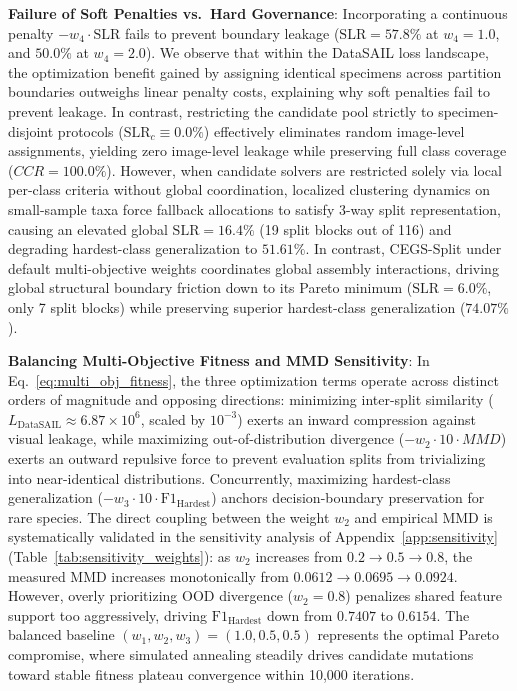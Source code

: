 \documentclass[a4paper,fleqn]{cas-sc}
\begin{document}
\textbf{Failure of Soft Penalties vs.\ Hard Governance}: Incorporating a continuous penalty $-w_4 \cdot \mathrm{SLR}$ fails to prevent boundary leakage ($\mathrm{SLR} = 57.8\%$ at $w_4=1.0$, and $50.0\%$ at $w_4=2.0$). We observe that within the DataSAIL loss landscape, the optimization benefit gained by assigning identical specimens across partition boundaries outweighs linear penalty costs, explaining why soft penalties fail to prevent leakage. In contrast, restricting the candidate pool strictly to specimen-disjoint protocols ($\text{SLR}_c \equiv 0.0\%$) effectively eliminates random image-level assignments, yielding zero image-level leakage while preserving full class coverage ($CCR = 100.0\%$). However, when candidate solvers are restricted solely via local per-class criteria without global coordination, localized clustering dynamics on small-sample taxa force fallback allocations to satisfy 3-way split representation, causing an elevated global $\mathrm{SLR} = 16.4\%$ (19 split blocks out of 116) and degrading hardest-class generalization to $51.61\%$. In contrast, CEGS-Split under default multi-objective weights coordinates global assembly interactions, driving global structural boundary friction down to its Pareto minimum ($\mathrm{SLR} = 6.0\%$, only 7 split blocks) while preserving superior hardest-class generalization ($74.07\%$).

\textbf{Balancing Multi-Objective Fitness and MMD Sensitivity}: In Eq.~\eqref{eq:multi_obj_fitness}, the three optimization terms operate across distinct orders of magnitude and opposing directions: minimizing inter-split similarity ($L_{\text{DataSAIL}} \approx 6.87 \times 10^6$, scaled by $10^{-3}$) exerts an inward compression against visual leakage, while maximizing out-of-distribution divergence ($-w_2 \cdot 10 \cdot MMD$) exerts an outward repulsive force to prevent evaluation splits from trivializing into near-identical distributions. Concurrently, maximizing hardest-class generalization ($-w_3 \cdot 10 \cdot \mathrm{F1}_{\text{Hardest}}$) anchors decision-boundary preservation for rare species. The direct coupling between the weight $w_2$ and empirical MMD is systematically validated in the sensitivity analysis of Appendix~\ref{app:sensitivity} (Table~\ref{tab:sensitivity_weights}): as $w_2$ increases from $0.2 \to 0.5 \to 0.8$, the measured MMD increases monotonically from $0.0612 \to 0.0695 \to 0.0924$. However, overly prioritizing OOD divergence ($w_2=0.8$) penalizes shared feature support too aggressively, driving $\mathrm{F1}_{\text{Hardest}}$ down from $0.7407$ to $0.6154$. The balanced baseline $(w_1, w_2, w_3) = (1.0, 0.5, 0.5)$ represents the optimal Pareto compromise, where simulated annealing steadily drives candidate mutations toward stable fitness plateau convergence within 10,000 iterations.
\end{document}
